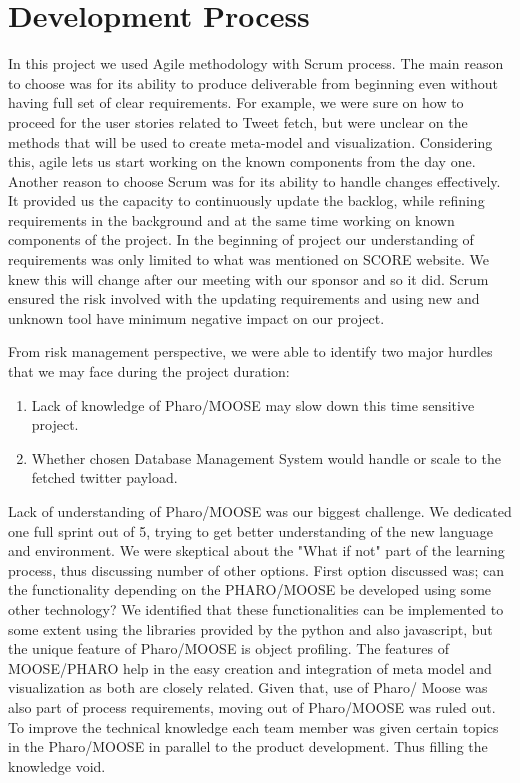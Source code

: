 \documentclass[11pt]{article}
\begin{document}
\section{Development Process}

In this project we used Agile methodology with Scrum process. The main reason to choose was for its ability to produce deliverable from beginning even without having full set of clear requirements. For example, we were sure on how to proceed for the user stories related to Tweet fetch, but were unclear on the methods that will be used to create meta-model and visualization. Considering this, agile lets us start working on the known components from the day one. Another reason to choose Scrum was for its ability to handle changes effectively. It provided us the capacity to continuously update the backlog, while refining requirements in the background and at the same time working on known components of the project. In the beginning of project our understanding of requirements was only limited to what was mentioned on SCORE website. We knew this will change after our meeting with our sponsor and so it did. Scrum ensured the risk involved with the updating requirements and using new and unknown tool have minimum negative impact on our project. 

From risk management perspective, we were able to identify two major hurdles that we may face during the project duration: 

\begin{enumerate}
\item Lack of knowledge of Pharo/MOOSE may slow down this time sensitive project.
\item Whether chosen Database Management System would handle or scale to the fetched twitter payload.
\end{enumerate}


Lack of understanding of Pharo/MOOSE was our biggest challenge. We dedicated one full sprint out of 5, trying to get better understanding of the new language and environment. We were skeptical about the "What if not" part of the learning process, thus discussing number of other options. First option discussed was; can the functionality depending on the PHARO/MOOSE be developed using some other technology? We identified that these functionalities can be implemented to some extent using the libraries provided by the python and also javascript, but the unique feature of Pharo/MOOSE is object profiling. The features of MOOSE/PHARO help in the easy creation and integration of meta model and visualization as both are closely related. Given that, use of Pharo/ Moose was also part of process requirements, moving out of Pharo/MOOSE was ruled out. To improve the technical knowledge each team member was given certain topics in the Pharo/MOOSE in parallel to the product development. Thus filling the knowledge void.
\end{document}

